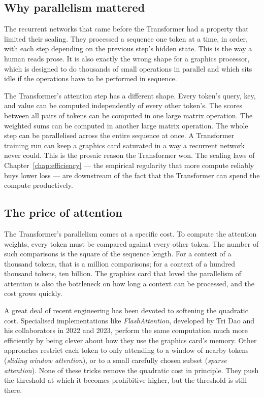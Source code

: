 \subsection*{Why parallelism mattered}

The recurrent networks that came before the Transformer had a
property that limited their scaling. They processed a sequence
one token at a time, in order, with each step depending on the
previous step's hidden state. This is the way a human reads
prose. It is also exactly the wrong shape for a graphics
processor, which is designed to do thousands of small operations
in parallel and which sits idle if the operations have to be
performed in sequence.

The Transformer's attention step has a different shape. Every
token's query, key, and value can be computed independently of
every other token's. The scores between all pairs of tokens can
be computed in one large matrix operation. The weighted sums can
be computed in another large matrix operation. The whole step
can be parallelised across the entire sequence at once. A
Transformer training run can keep a graphics card saturated in
a way a recurrent network never could. This is the prosaic
reason the Transformer won. The scaling laws of Chapter~\ref{chap:efficiency} --- the
empirical regularity that more compute reliably buys lower loss
--- are downstream of the fact that the Transformer can spend
the compute productively.

\subsection*{The price of attention}

The Transformer's parallelism comes at a specific cost. To
compute the attention weights, every token must be compared
against every other token. The number of such comparisons is
the square of the sequence length. For a context of a thousand
tokens, that is a million comparisons; for a context of a
hundred thousand tokens, ten billion. The graphics card that
loved the parallelism of attention is also the bottleneck on
how long a context can be processed, and the cost grows quickly.

A great deal of recent engineering has been devoted to softening
the quadratic cost. Specialised implementations like
\emph{FlashAttention}, developed by Tri Dao and his
collaborators in 2022 and 2023, perform the same computation
much more efficiently by being clever about how they use the
graphics card's memory. Other approaches restrict each token to
only attending to a window of nearby tokens (\emph{sliding
window attention}), or to a small carefully chosen subset
(\emph{sparse attention}). None of these tricks remove the
quadratic cost in principle. They push the threshold at which it
becomes prohibitive higher, but the threshold is still there.

